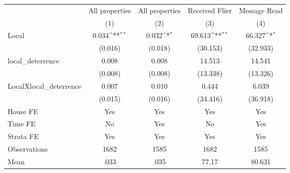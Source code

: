 {
\def\sym#1{\ifmmode^{#1}\else\(^{#1}\)\fi}
\begin{tabular}{l*{4}{c}}
\hline\hline
                &\multicolumn{1}{c}{All properties}&\multicolumn{1}{c}{All properties}&\multicolumn{1}{c}{Received Flier}&\multicolumn{1}{c}{Message Read}\\
                &\multicolumn{1}{c}{(1)}         &\multicolumn{1}{c}{(2)}         &\multicolumn{1}{c}{(3)}         &\multicolumn{1}{c}{(4)}         \\
\hline
Local           &    0.034\sym{**} &    0.032\sym{*}  &   69.613\sym{**} &   66.327\sym{*}  \\
                &  (0.016)         &  (0.018)         & (30.153)         & (32.933)         \\
local\_deterrence&    0.008         &    0.008         &   14.513         &   14.541         \\
                &  (0.008)         &  (0.008)         & (13.338)         & (13.326)         \\
LocalXlocal\_deterrence&    0.007         &    0.010         &    0.444         &    6.039         \\
                &  (0.015)         &  (0.016)         & (34.416)         & (36.918)         \\
House FE        &      Yes         &      Yes         &      Yes         &      Yes         \\
Time FE         &       No         &      Yes         &       No         &      Yes         \\
Strata FE       &      Yes         &      Yes         &      Yes         &      Yes         \\
\hline
Observations    &     1682         &     1585         &     1682         &     1585         \\
Mean            &     .033         &     .035         &    77.17         &   80.631         \\
\hline\hline
\end{tabular}
}
